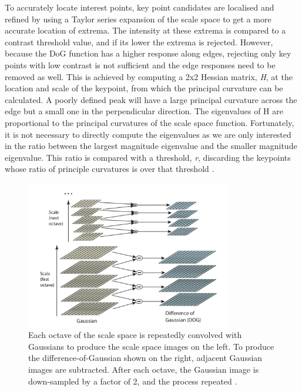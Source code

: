 \documentclass{l4proj}
\begin{document}
To accurately locate interest points, key point candidates are localised and refined by using
a Taylor series expansion of the scale space to get a more accurate location of extrema. The
intensity at these extrema is compared to a contrast threshold value, and if its lower the
extrema is rejected. However, because the DoG function has a higher response along edges,
rejecting only key points with low contrast is not sufficient and the edge responses need to be removed as well. This is achieved by computing a 2x2 Hessian matrix, \textit{H}, at the location and scale of the keypoint, from which the principal curvature can be calculated. A poorly defined peak will have a large principal curvature across the edge but a small one in the
perpendicular direction. The eigenvalues of H are proportional to the principal curvatures of
the scale space function. Fortunately, it is not necessary to directly compute the eigenvalues
as we are only interested in the ratio between the largest magnitude eigenvalue and the
smaller magnitude eigenvalue. This ratio is compared with a threshold, \textit{r}, discarding the
keypoints whose ratio of principle curvatures is over that threshold \citep{Lowe04}.

\begin{figure}[ht]
    \centering
    \includegraphics[width=0.8\textwidth]{l4template-master/images/gaussianPyramid.png}
    \caption{Each octave of the scale space is repeatedly convolved with Gaussians to produce the scale space images on the left. To produce the difference-of-Gaussian shown on the right, adjacent Gaussian images are subtracted. After each octave, the Gaussian image is down-sampled by a factor of 2, and the process repeated \citep{Lowe04}.}
    \label{gaussianpyramid}
\end{figure}
\end{document}
